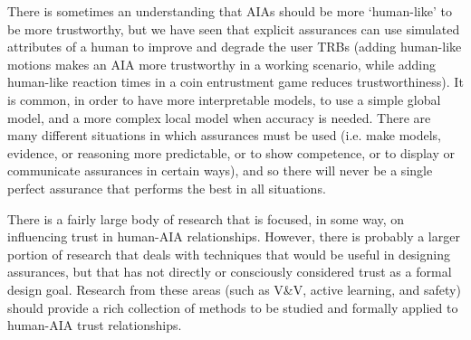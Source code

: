     There is sometimes an understanding that AIAs should be more `human-like' to be more trustworthy, but we have seen that explicit assurances can use simulated attributes of a human to improve and degrade the user TRBs (adding human-like motions makes an AIA more trustworthy in a working scenario, while adding human-like reaction times in a coin entrustment game reduces trustworthiness). It is common, in order to have more interpretable models, to use a simple global model, and a more complex local model when accuracy is needed. There are many different situations in which assurances must be used (i.e. make models, evidence, or reasoning more predictable, or to show competence, or to display or communicate assurances in certain ways), and so there will never be a single perfect assurance that performs the best in all situations.

    There is a fairly large body of research that is focused, in some way, on influencing trust in human-AIA relationships. However, there is probably a larger portion of research that deals with techniques that would be useful in designing assurances, but that has not directly or consciously considered trust as a formal design goal. Research from these areas (such as V\&V, active learning, and safety) should provide a rich collection of methods to be studied and formally applied to human-AIA trust relationships.

\newpage

